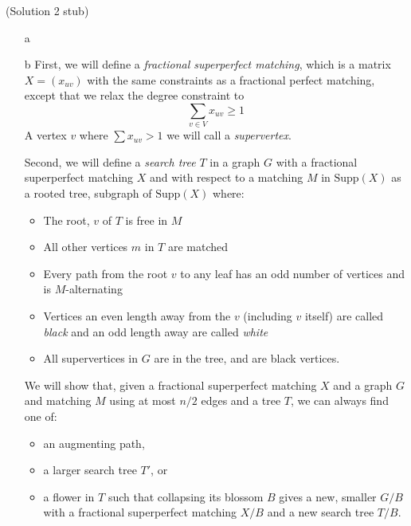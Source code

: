 \documentclass{hmcpset}
\begin{document}
\begin{solution}
(Solution 2 stub)
\begin{enumerate}
\item[a] 
\item[b] First, we will define a \emph{fractional superperfect matching}, which is a matrix $X=(x_{uv})$ with the same constraints as a fractional perfect matching, except that we relax the degree constraint to
\[\sum_{v\in V} x_{uv} \geq 1\]
A vertex $v$ where $\sum x_{uv} > 1$ we will call a \emph{supervertex}.

Second, we will define a \emph{search tree} $T$ in a graph $G$ with a fractional superperfect matching $X$ and with respect to a matching $M$ in $\text{Supp}(X)$ as a rooted tree, subgraph of $\text{Supp}(X)$ where:
\begin{itemize}
\item The root, $v$ of $T$ is free in $M$
\item All other vertices $m$ in $T$ are matched
\item Every path from the root $v$ to any leaf has an odd number of vertices and is $M$-alternating
\item Vertices an even length away from the $v$ (including $v$ itself) are called \emph{black} and an odd length away are called \emph{white}
\item All supervertices in $G$ are in the tree, and are black vertices.
\end{itemize}

We will show that, given a fractional superperfect matching $X$ and a graph $G$ and matching $M$ using at most $n/2$ edges and a tree $T$, we can always find one of:
\begin{itemize} 
\item an augmenting path,
\item a larger search tree $T'$, or
\item a flower in $T$ such that collapsing its blossom $B$ gives a new, smaller $G/B$ with a fractional superperfect matching $X/B$ and a new search tree $T/B$.
\end{itemize}


\end{enumerate}
\end{solution}
\end{document}
